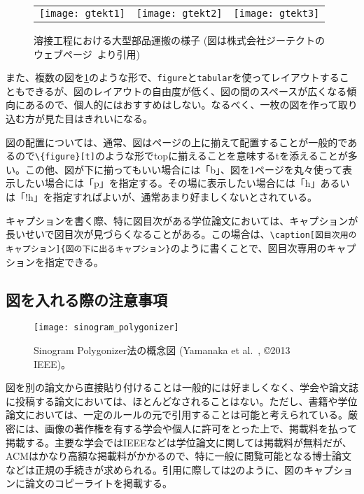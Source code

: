 \begin{figure}[tbp]
	\centering
	\begin{tabular}{ccc}
    \texttt{[image: gtekt1]} &
    \texttt{[image: gtekt2]} &
    \texttt{[image: gtekt3]}
  \end{tabular}
	\caption[溶接工程における大型部品運搬の様子]{溶接工程における大型部品運搬の様子 (図は株式会社ジーテクトのウェブページ~\cite{GTekt}より引用)}
	\label{fig:welding}
\end{figure}

また、複数の図を\cref{fig:welding}のような形で、\texttt{figure}と\texttt{tabular}を使ってレイアウトすることもできるが、図のレイアウトの自由度が低く、図の間のスペースが広くなる傾向にあるので、個人的にはおすすめはしない。なるべく、一枚の図を作って取り込む方が見た目はきれいになる。

図の配置については、通常、図はページの上に揃えて配置することが一般的であるので\texttt{\textbackslash \{figure\}[t]}のような形でtopに揃えることを意味するtを添えることが多い。この他、図が下に揃ってもいい場合には「b」、図を1ページを丸々使って表示したい場合には「p」を指定する。その場に表示したい場合には「h」あるいは「!h」を指定すればよいが、通常あまり好ましくないとされている。

キャプションを書く際、特に図目次がある学位論文においては、キャプションが長いせいで図目次が見づらくなることがある。この場合は、\texttt{\textbackslash caption[図目次用のキャプション]\{図の下に出るキャプション\}}のように書くことで、図目次専用のキャプションを指定できる。

\subsection{図を入れる際の注意事項}

\begin{figure}[tbp]
  \centering
  \texttt{[image: sinogram\_polygonizer]}
  \caption[Sinogram Polygonizer法の概念図]{Sinogram Polygonizer法の概念図 (Yamanaka et al.~\cite{yamanaka2013sinogram}, \copyright 2013 IEEE)。}
  \label{fig:sinogram-polygonizer}
\end{figure}

図を別の論文から直接貼り付けることは一般的には好ましくなく、学会や論文誌に投稿する論文においては、ほとんどなされることはない。ただし、書籍や学位論文においては、一定のルールの元で引用することは可能と考えられている。厳密には、画像の著作権を有する学会や個人に許可をとった上で、掲載料を払って掲載する。主要な学会ではIEEEなどは学位論文に関しては掲載料が無料だが、ACMはかなり高額な掲載料がかかるので、特に一般に閲覧可能となる博士論文などは正規の手続きが求められる。引用に際しては\cref{fig:sinogram-polygonizer}のように、図のキャプションに論文のコピーライトを掲載する。


